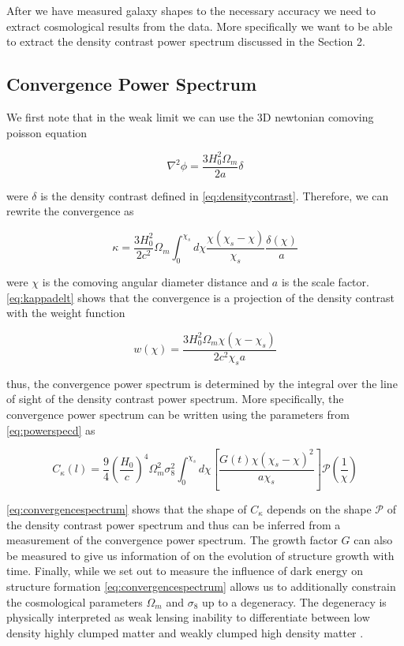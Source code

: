After we have measured galaxy shapes to the necessary accuracy we need to extract cosmological results from the data. More specifically we want to be able to extract the density contrast power spectrum discussed in the Section 2. 

\subsection{Convergence Power Spectrum}
We first note that in the weak limit we can use the 3D newtonian comoving poisson equation

\begin{equation}
    \nabla^2 \phi = \frac{3H_0 ^2\Omega_m }{2a} \delta
    \label{eq:poisson}
\end{equation}

were $\delta$ is the density contrast defined in \autoref{eq:densitycontrast}. Therefore, we can rewrite the convergence as

\begin{equation}
    \kappa = \frac{3H_0^2}{2c^2} \Omega_m \int_{0}^{\chi_s} d\chi  \frac{\chi (\chi_s-\chi)}{\chi_s} \frac{\delta(\chi)}{a}
    \label{eq:kappadelt}
\end{equation}

were $\chi$ is the comoving angular diameter distance and $a$ is the scale factor. \autoref{eq:kappadelt} shows that the convergence is a projection of the density contrast with the weight function 

\begin{equation}
    w(\chi) = \frac{3H_0^2 \Omega_m \chi (\chi - \chi_s)}{2 c^2 \chi_s a}
    \label{eq:weight}
\end{equation}

thus, the convergence power spectrum is determined by the integral over the line of sight of the density contrast power spectrum\cite{Hoekstra:2013gua,rachel_2018,Bartelmann:2016dvf}. More specifically, the convergence power spectrum can be written using the parameters from \autoref{eq:powerspecd} as 

\begin{equation}
    C_\kappa(l) = \frac{9}{4} \left(\frac{H_0}{c}\right)^4\Omega_m^2 \sigma_8^2 \int^{\chi_s}_0 d \chi \left[\frac{G(t)\chi (\chi_s-\chi)^2}{a \chi_s}\right] \mathcal{P}\left(\frac{1}{\chi}\right)
    \label{eq:convergencespectrum}
\end{equation}

\autoref{eq:convergencespectrum} shows that the shape of $C_\kappa$ depends on the shape $\mathcal{P}$ of the density contrast power spectrum and thus can be inferred from a measurement of the convergence power spectrum. The growth factor $G$ can also be measured to give us information of on the evolution of structure growth with time. Finally, while we set out to measure the influence of dark energy on structure formation \autoref{eq:convergencespectrum} allows us to additionally constrain the cosmological parameters $\Omega_m$ and $\sigma_8$ up to a degeneracy. The degeneracy is physically interpreted as weak lensing inability to differentiate between low density highly clumped matter and weakly clumped high density matter \cite{general_2013,Bartelmann:2016dvf}. 

